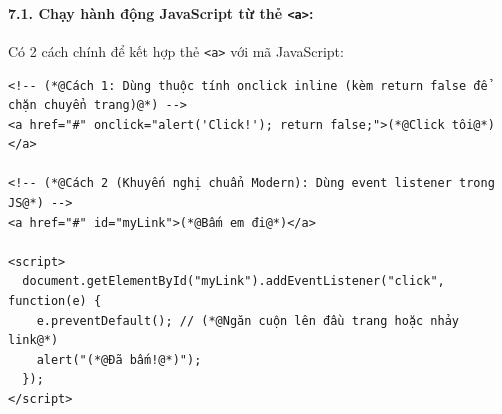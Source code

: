 \documentclass[11pt,oneside]{book}
\newcommand{\codeinline}[1]{\textcolor{accentOrange}{\texttt{#1}}}
\begin{document}
\paragraph{7.1. Chạy hành động JavaScript từ thẻ \codeinline{<a>}:}
Có 2 cách chính để kết hợp thẻ \codeinline{<a>} với mã JavaScript:

\begin{codeWindow}
\begin{lstlisting}[language=HTML5]
<!-- (*@Cách 1: Dùng thuộc tính onclick inline (kèm return false để chặn chuyển trang)@*) -->
<a href="#" onclick="alert('Click!'); return false;">(*@Click tôi@*)</a>

<!-- (*@Cách 2 (Khuyến nghị chuẩn Modern): Dùng event listener trong JS@*) -->
<a href="#" id="myLink">(*@Bấm em đi@*)</a>

<script>
  document.getElementById("myLink").addEventListener("click", function(e) {
    e.preventDefault(); // (*@Ngăn cuộn lên đầu trang hoặc nhảy link@*)
    alert("(*@Đã bấm!@*)");
  });
</script>
\end{lstlisting}
\end{codeWindow}
\end{document}
